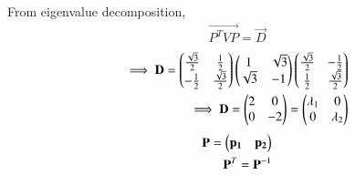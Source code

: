 From eigenvalue decomposition,
\begin{align}
    \vec{P^TVP}=\vec{D}\label{eq:solutions/3/4/4/eq:eigval}
\end{align}
\begin{align}
    \implies\mathbf{D}=\begin{pmatrix}\frac{\sqrt{3}}{2} & \frac{1}{2} \\ -\frac{1}{2} & \frac{\sqrt{3}}{2}\end{pmatrix}\begin{pmatrix}1 & \sqrt{3} \\ \sqrt{3} & -1\end{pmatrix}\begin{pmatrix}\frac{\sqrt{3}}{2} & -\frac{1}{2} \\ \frac{1}{2} & \frac{\sqrt{3}}{2}\end{pmatrix}\\
    \implies\mathbf{D}=\begin{pmatrix}2 & 0 \\ 0 & -2\end{pmatrix}=\begin{pmatrix}\lambda_1 & 0 \\ 0 & \lambda_2\end{pmatrix}\label{eq:solutions/3/4/4/eq:D}
\end{align}
\begin{align}
    \mathbf{P}=\begin{pmatrix}\mathbf{p_1} & \mathbf{p_2}\end{pmatrix}\\
    \mathbf{P}^T=\mathbf{P}^{-1}
\end{align}

